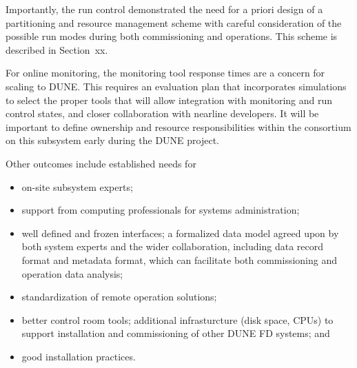 Importantly, the  run control demonstrated the need for a priori design of a 
partitioning and resource management scheme with careful
consideration of the possible run modes during both commissioning and operations. This scheme is described in Section~xx.

For online monitoring, the monitoring tool response times are a
concern for scaling to DUNE. %
This requires an evaluation plan that incorporates simulations to select the proper tools that will allow
integration with  monitoring and run control
states,  and closer collaboration with nearline developers. It will be
important to define ownership and resource responsibilities within the
 consortium on this
subsystem early during the DUNE project.

Other outcomes include established needs for 
\begin{itemize}
\item on-site
subsystem experts; 
\item support from computing professionals
for systems administration; 
\item well defined and frozen interfaces;
a formalized data model agreed upon by both system experts and the wider
collaboration, including data record format and metadata format, which can facilitate both commissioning and operation
data analysis; 
\item standardization of remote  operation solutions;
\item better control room tools; additional  infrasturcture (disk
space, CPUs) to support installation and commissioning of other DUNE
FD systems; and 
\item good
installation practices.
\end{itemize}



